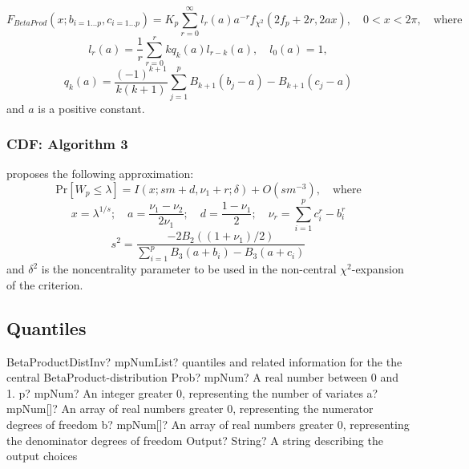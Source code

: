 \begin{equation}
	F_{BetaProd}(x; b_{i=1\ldots p},c_{i=1\ldots p}) = K_p \sum_{r=0}^\infty l_r(a) a^{-r} f_{\chi^2}(2 f_p +2r, 2ax), \quad 0<x<2\pi, \quad  \text{where}
\end{equation}
\begin{equation}
	l_r(a) = \frac{1}{r} \sum_{r=0}^r k q_k(a) l_{r-k}(a), \quad l_0(a)=1,
\end{equation}
\begin{equation}
	q_k(a) = \frac{(-1)^{k+1}}{k(k+1)} \sum_{j=1}^p{B_{k+1}(b_j-a) - B_{k+1}(c_j-a)}
\end{equation}
and $a$ is a positive constant. 





\subsubsection{CDF: Algorithm 3}
\cite{Nagarsenker_1983} proposes the following approximation:
\begin{equation}
	\text{Pr}[W_p \leq \lambda] =  I(x; sm + d, \nu_1 + r; \delta) + O(sm^{-3}), \quad \text{where}
\end{equation}
\begin{equation}
	x=\lambda^{1/s}; \quad a=\frac{\nu_1 - \nu_2}{2\nu_1}; \quad d=\frac{1-\nu_1}{2};  \quad \nu_r=\sum_{i=1}^p{c_i^r - b_i^r}
\end{equation}
\begin{equation}
	s^2 = \frac{-2B_2((1+\nu_1)/2)}{\sum_{i=1}^p{B_3(a+b_i) - B_3(a+c_i) }}
\end{equation}
and $\delta^2$ is the noncentrality parameter to be used in the non-central $\chi^2$-expansion of the criterion.


\subsection{Quantiles}

\begin{mpFunctionsExtract}
	\mpFunctionFiveNotImplemented
	{BetaProductDistInv? mpNumList? quantiles and related information for the the central BetaProduct-distribution}
	{Prob? mpNum? A real number between 0 and 1.}
	{p? mpNum? An integer greater 0, representing the number of variates}
	{a? mpNum[]? An array of real numbers greater 0, representing the numerator  degrees of freedom}
	{b? mpNum[]? An array of real numbers greater 0, representing the denominator degrees of freedom}
	{Output? String? A string describing the output choices}
\end{mpFunctionsExtract}

